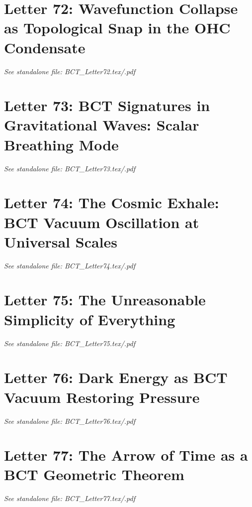 \documentclass[aps,preprint,superscriptaddress,floatfix]{revtex4-2}
\begin{document}
\section*{Letter 72: Wavefunction Collapse as Topological Snap in the OHC Condensate}
\textit{See standalone file: BCT\_Letter72.tex/.pdf}

\newpage
\section*{Letter 73: BCT Signatures in Gravitational Waves: Scalar Breathing Mode}
\textit{See standalone file: BCT\_Letter73.tex/.pdf}

\newpage
\section*{Letter 74: The Cosmic Exhale: BCT Vacuum Oscillation at Universal Scales}
\textit{See standalone file: BCT\_Letter74.tex/.pdf}

\newpage
\section*{Letter 75: The Unreasonable Simplicity of Everything}
\textit{See standalone file: BCT\_Letter75.tex/.pdf}

\newpage
\section*{Letter 76: Dark Energy as BCT Vacuum Restoring Pressure}
\textit{See standalone file: BCT\_Letter76.tex/.pdf}

\newpage
\section*{Letter 77: The Arrow of Time as a BCT Geometric Theorem}
\textit{See standalone file: BCT\_Letter77.tex/.pdf}

\newpage
\end{document}
